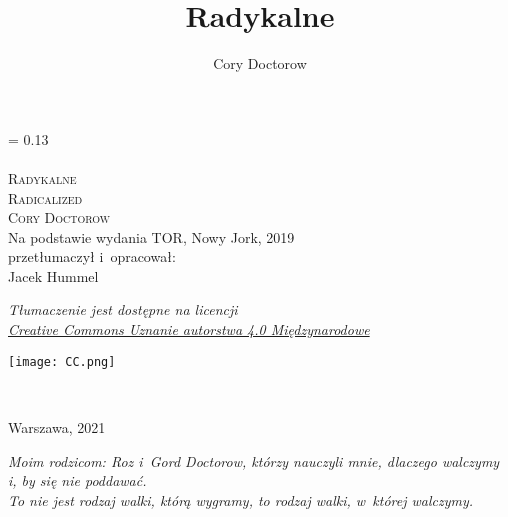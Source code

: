 \documentclass[oneside,polish,11pt,sfheadings]{mwbk}
\begin{document}
\title{Radykalne}
\author{Cory Doctorow}


\DeclareRobustCommand{\cs}[1]{\texttt{\char`\\#1}}
\newlength{\tpheight}\setlength{\tpheight}{0.9\textheight}
\newlength{\txtheight}\setlength{\txtheight}{0.9\tpheight}
\newlength{\tpwidth}\setlength{\tpwidth}{0.9\textwidth}
\newlength{\txtwidth}\setlength{\txtwidth}{0.9\tpwidth}
\newlength{\drop}
\newcommand*{\titleSI}{\begingroup%
\drop = 0.13\txtheight
\centering
{\Huge \textsf{~}}\\[1\baselineskip]
{\huge \textsf{~}}\\[1\baselineskip]
{\Huge \textsc{Radykalne}}\\[1\baselineskip]
{\LARGE \textsc{Radicalized}}\\[2\baselineskip]
{\huge \textsc{Cory Doctorow}}\\[4\baselineskip]
{\large Na podstawie wydania TOR, Nowy Jork, 2019 \\ przetłumaczył i~opracował:}\\
{\Large Jacek Hummel}\\[1\baselineskip]
{\normalsize \textit{Tłumaczenie jest dostępne na licencji\\
\href{https://creativecommons.org/licenses/by/4.0/deed.pl}{Creative Commons Uznanie autorstwa 4.0 Międzynarodowe}} \\ [1\baselineskip] \par}
\texttt{[image: CC.png]}

~

\vfill
{\Large {Warszawa, 2021}}\\
\endgroup}
\titleSI
\thispagestyle{empty}

\begin{figure}[p]
    \vspace*{-1cm}
\end{figure}
\thispagestyle{empty}

\newpage

\thispagestyle{empty}
\vspace*{\fill}
\textit{Moim rodzicom: Roz i~Gord Doctorow, którzy nauczyli mnie, dlaczego
walczymy i, by się nie poddawać.}\\

\textit{To nie jest rodzaj walki, którą wygramy, to rodzaj walki, w~której walczymy.}
\end{document}
